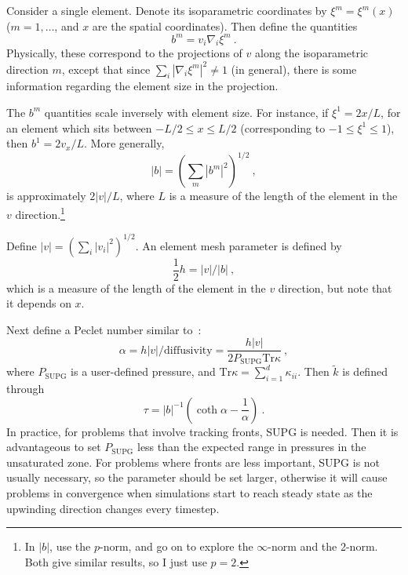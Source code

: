 \documentclass[]{scrreprt}
\begin{document}
Consider a single element.  Denote its isoparametric coordinates by
$\xi^{m} = \xi^{m}(x)$ ($m=1,\ldots$, and $x$ are
the spatial coordinates).  Then define the quantities
\begin{equation}
b^{m} = v_{i}\nabla_{i}\xi^{m} \ .
\label{eqn.b.params.supg}
\end{equation}
Physically, these correspond to the projections of $v$ along the
isoparametric direction $m$, except that since
$\sum_{i}|\nabla_{i}\xi^{m}|^{2} \neq 1$ (in general), there is some
information regarding the element size in the projection.

The $b^{m}$ quantities scale inversely with element size.  For
instance, if $\xi^{1} = 2x/L$, for an element which sits between $-L/2
\leq x \leq L/2$ (corresponding to $-1\leq \xi^{1} \leq 1$), then
$b^{1} = 2v_{x}/L$.  More generally,
\begin{equation}
|b|=(\sum_{m}|b^{m}|^{2})^{1/2} \ ,
\end{equation}
is approximately $2|v|/L$, where $L$ is a measure of the length of the
element in the $v$ direction.\footnote{In $|b|$, \cite{hughesET1986} use the
$p$-norm, and go on to explore the $\infty$-norm and the 2-norm.  Both
give similar results, so I just use $p=2$.}

Define $|v|=(\sum_{i}|v_{i}|^{2})^{1/2}$.  An element mesh parameter
is defined by
\begin{equation}
\mbox{$\frac{1}{2}$}h = |v|/|b| \ ,
\end{equation}
which is a measure of the length of the element in the $v$ direction,
but note that it depends on $x$.

Next define a Peclet number similar to~\cite{hughesET1986}:
\begin{equation}
\alpha = h|v|/\mathrm{diffusivity} =
\frac{h|v|}{2P_{\mathrm{SUPG}}\mbox{Tr}\kappa}
\ ,
\end{equation}
where $P_{\mathrm{SUPG}}$ is a user-defined pressure, and
$\mbox{Tr}\kappa = \sum_{i=1}^{d}\kappa_{ii}$.  Then $\tilde{k}$ is
defined through
\begin{equation}
\tau = |b|^{-1} \left( \coth\alpha - \frac{1}{\alpha}\right) \ .
\end{equation}
In practice, for problems that involve tracking fronts, SUPG is
needed.  Then it is advantageous to set $P_{\mathrm{SUPG}}$ less than
the expected range in pressures in the unsaturated zone.  For problems
where fronts are less important, SUPG is not usually necessary, so the
parameter should be set larger, otherwise it will cause problems in
convergence when simulations start to reach steady state as the upwinding direction changes every timestep.
\end{document}
